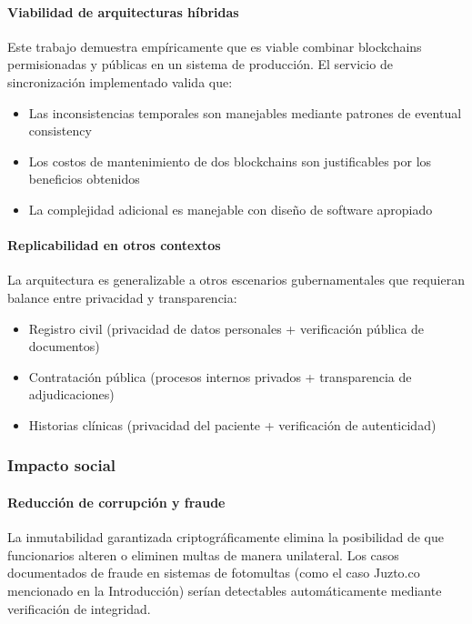 \paragraph{Viabilidad de arquitecturas híbridas}
Este trabajo demuestra empíricamente que es viable combinar blockchains permisionadas y públicas en un sistema de producción. El servicio de sincronización implementado valida que:
\begin{itemize}
    \item Las inconsistencias temporales son manejables mediante patrones de eventual consistency
    \item Los costos de mantenimiento de dos blockchains son justificables por los beneficios obtenidos
    \item La complejidad adicional es manejable con diseño de software apropiado
\end{itemize}

\paragraph{Replicabilidad en otros contextos}
La arquitectura es generalizable a otros escenarios gubernamentales que requieran balance entre privacidad y transparencia:
\begin{itemize}
    \item Registro civil (privacidad de datos personales + verificación pública de documentos)
    \item Contratación pública (procesos internos privados + transparencia de adjudicaciones)
    \item Historias clínicas (privacidad del paciente + verificación de autenticidad)
\end{itemize}

\subsubsection{Impacto social}

\paragraph{Reducción de corrupción y fraude}
La inmutabilidad garantizada criptográficamente elimina la posibilidad de que funcionarios alteren o eliminen multas de manera unilateral. Los casos documentados de fraude en sistemas de fotomultas (como el caso Juzto.co mencionado en la Introducción) serían detectables automáticamente mediante verificación de integridad.

